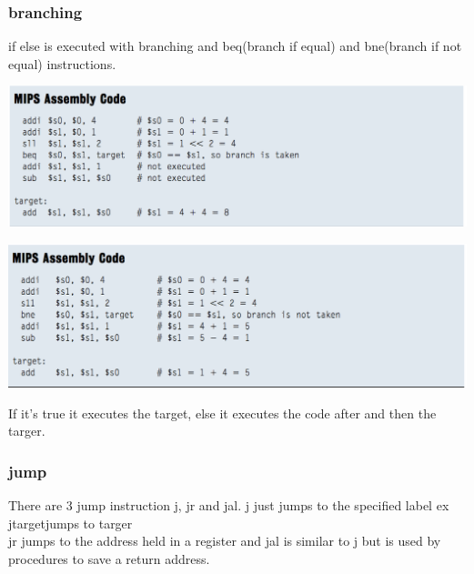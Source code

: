 		\subsubsection{branching}
		if else is executed with branching and beq(branch if equal) and bne(branch if not equal) instructions.
		\begin{center}
				\includegraphics[width = 18cm]{images/beq}
		\end{center}
		\begin{center}
				\includegraphics[width = 18cm]{images/bne}
		\end{center}
		If it's true it executes the target, else it executes the code after and then the targer.
		\subsubsection{jump}
			There are 3 jump instruction j, jr and jal. j just jumps to the specified label ex\\
			j\tab target\tab jumps to targer\\
			jr jumps to the address held in a register and jal is similar to j but is used by procedures to save a return address.
